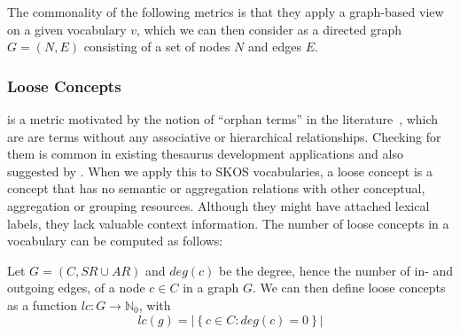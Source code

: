 The commonality of the following metrics is that they apply a graph-based view on a given vocabulary \(v\), which we can then consider as a directed graph \(G=(N,E)\) consisting of a set of nodes \(N\) and edges \(E\).

\subsubsection{Loose Concepts} is a metric motivated by the notion of ``orphan terms'' in the literature~\cite{Hedden2010}, which are are terms without any associative or hierarchical relationships. Checking for them is common in existing thesaurus development applications and also suggested by \cite{Z39.19:2005}. When we apply this to SKOS vocabularies, a loose concept is a concept that has no semantic or aggregation relations with other conceptual, aggregation or grouping resources. Although they might have attached lexical labels, they lack valuable context information. The number of loose concepts in a vocabulary can be computed as follows:


\begin{definition}
    
Let \(G = (C, SR \cup AR)\) and \(deg(c)\) be the degree, hence the number of in- and outgoing edges, of a node $c \in C$ in a graph $G$. We can then define loose concepts as a function \(lc : G \rightarrow \mathbb{N}_{0}\), with \[lc(g) = \left|\left\{c \in C : deg(c) = 0\right\}\right|\]

\end{definition}

